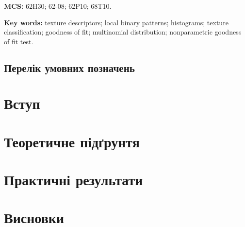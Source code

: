 \documentclass{thesis}
\newcommand{\MSCEn}{62H30; 62-08; 62P10; 68T10.}
\newcommand{\1}{\mathbb 1}
\begin{document}
\bigskip

\noindent
{\bf MCS:} \MSCEn %


\bigskip

\noindent
{\bf Key words:} texture descriptors; local binary patterns; histograms; texture classification; goodness of fit; multinomial distribution; nonparametric goodness of fit test.


\newpage


\tableofcontents

\newpage

\section*{Перелік умовних позначень}


\newpage

\chapter*{Вступ}\label{Introduction}


\newpage

\chapter{Теоретичне підґрунтя}\label{chapter1}







\newpage

\chapter{Практичні результати}\label{chapter2}





\newpage

\chapter*{Висновки}
\end{document}

